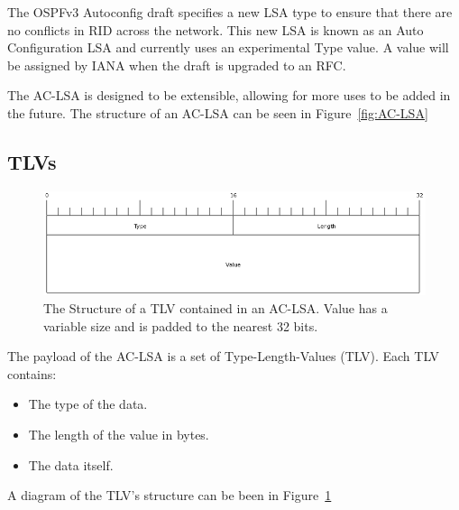 \documentclass[12pt,a4paper,twoside]{report}
\begin{document}
The OSPFv3 Autoconfig draft specifies a new LSA type to ensure that
there are no conflicts in RID across the network. This new LSA is known
as an Auto Configuration LSA and currently uses an experimental Type value. A
value will be assigned by IANA when the draft is upgraded to an RFC. 

The AC-LSA is designed to be extensible, allowing for more uses to be added in
the future. The structure of an AC-LSA can be seen in Figure~\ref{fig:AC-LSA} 

\subsection{TLVs}
\begin{figure}
\begin{center}
	\includegraphics[width=\linewidth]{../Diagrams/Packets/tlv.png}
	\caption{The Structure of a TLV contained in an AC-LSA\@. Value has a variable
	size and is padded to the nearest 32 bits.}\label{fig:TLV}
\end{center}
\end{figure}

The payload of the AC-LSA is a set of Type-Length-Values (TLV). Each TLV
contains: 
\begin{itemize}
    \item The type of the data.
    \item The length of the value in bytes.
    \item The data itself.
  \end{itemize}

A diagram of the TLV's structure can be been in Figure~\ref{fig:TLV}
\end{document}
